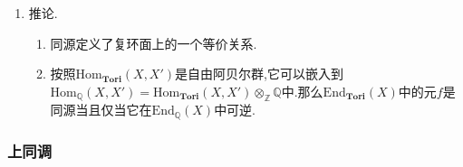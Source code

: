 \begin{enumerate}
\begin{proof}
    	按照$\ker f\subseteq\ker[e]=X[e]$,存在唯一的同态$g:X'\to X$使得$gf=[e]$,这个$g$也是同源.任取$x'\in\ker g$,那么存在$x\in\ker[e]_X$满足$f(x)=x'$,并且有$ex'=ef(x)=f(ex)=0$,于是$\ker g\subseteq X'[e]$.于是存在同源$f':X\to X'$使得$f'g=[e]_{X'}$.最后$f'[e]_X=f'gf=[e]_{X'}f=f[e]_X$,从$[e]_X$是满射得到$f=f'$.
    \end{proof}
    \item 推论.
    \begin{enumerate}[(1)]
    	\item 同源定义了复环面上的一个等价关系.
    	\item 按照$\mathrm{Hom}_{\textbf{Tori}}(X,X')$是自由阿贝尔群,它可以嵌入到$\mathrm{Hom}_{\mathbb{Q}}(X,X')=\mathrm{Hom}_{\textbf{Tori}}(X,X')\otimes_{\mathbb{Z}}\mathbb{Q}$中.那么$\mathrm{End}_{\textbf{Tori}}(X)$中的元$f$是同源当且仅当它在$\mathrm{End}_{\mathbb{Q}}(X)$中可逆.
    \end{enumerate}
\end{enumerate}
\subsubsection{上同调}

